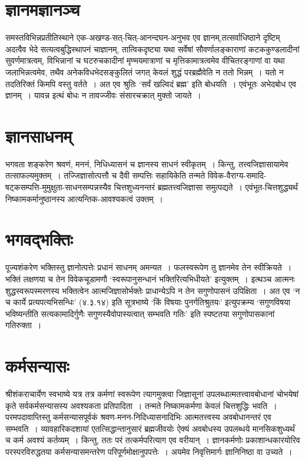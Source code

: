 {\section*{ज्ञानमज्ञानञ्च}

समस्तविभिन्नप्रतीतिस्थाने एक-अखण्ड-सत्-चित्-आनन्दघन-अनुभव एव ज्ञानम्,\break तत्सर्वाधिष्ठाने दृष्टिम् अदत्वैव भेदे सत्यत्वबुद्धिस्थापनं चाज्ञानम्, तात्विकदृष्ट्या यथा सर्वेषां सौवर्णालङ्काराणां कटककुण्डलादीनां सुवर्णमात्रत्वम्, विभिन्नानां च घटरुचकादीनां मृण्मयमात्राणां च मृत्तिकामात्रत्वमेव वीचितरङ्गाणां वा यथा जलाभिन्नत्वमेव, तथैव अनेकविध\-भेदसङ्कुलितं जगत् केवलं शुद्धं परब्रह्मैवेति न ततो भिन्नम्~। यतो न तदतिरिक्तं किमपि वस्तु वर्तते~। अत एव श्रुतिः ‘सर्वं खल्विदं ब्रह्म’ इति बोधयति~। एवंभूतः अभेदबोध एव ज्ञानम्~। यावन्न इत्थं बोधः न तावज्जीवः संसारचक्रात् मुक्तो जायते~। 

\section*{ज्ञानसाधनम्}

भगवता शङ्करेण श्रवणं, मननं, निधिध्यासनं च ज्ञानस्य साधनं स्वीकृतम्~। किन्तु, तत्त्वजिज्ञासायामेव तत्साफल्यमुक्तम्~। तज्जिज्ञासोत्पत्तौ च दैवी सम्पत्तिः सहायिकेति तन्मते विवेक-वैराग्य-समादि-षट्कसम्पत्ति-मुमुक्षुता-साधनसम्पन्नस्यैव चित्तशुध्यनन्तरं ब्रह्मतत्त्वजिज्ञासा समुत्पद्यते~। एवंभूत-चित्तशुद्ध्यर्थं निष्कामकर्मानुष्ठानस्य आत्यन्तिक-आवश्यकत्वं उक्तम्~। 

\section*{भगवद्भक्तिः}

पूज्यशंकरेण भक्तिस्तु ज्ञानोत्पत्तेः प्रधानं साधनम् अमन्यत~। फलस्वरूपेण तु ज्ञानमेव तेन स्वीक्रियते~। भक्तिं लक्षणया च तेन विवेकचूडामणौ ‘स्वरूपानुसन्धानं भक्तिरित्यभिधीयते’ इत्युक्तम्~। इत्थञ्च आत्मनः शुद्धस्वरूपस्मरणस्य भक्तित्वेन आत्मजिज्ञासोर्भक्तेः प्राधान्येऽपि न तेन सगुणोपासनं उपिक्षिता~। अत एव ‘न च कार्ये प्रत्यपत्यभिसन्धिः’ (४.३.१४) इति सूत्रभाष्ये ‘किं विषयाः पुनर्गतिश्रुतयः’ इत्युपक्रम्य ‘सगुणविषया भविष्यन्तीति सत्यकामादिर्गुणैः सगुणस्यैवोपास्यत्वात् सम्भवति गतिः’ इति स्पष्टतया सगुणोपासकानां गतिरुक्ता~। 

\section*{कर्मसन्यासः}

श्रीशंकराचार्येण स्वभाष्ये यत्र तत्र कर्मणां स्वरूपेण त्यागमुक्त्वा जिज्ञासूनां उपलब्धात्मतत्त्वावबोधानां चोभयेषां कृते सर्वकर्मसन्यासस्य अवश्यकता प्रतिपादिता~। तन्मते निष्काम\-कर्मणा केवलं चित्तशुद्धिः भवति~। परमपदावाप्तिस्तु कर्मसन्यासपूर्वकं श्रवण-मनन-निदिध्या\-सनादिभिः आत्मतत्त्वस्य अवबोधानन्तरं एव सम्भवति~। व्यावहारिकदशायां एतत्सिद्धान्तानुसारं ब्रह्मजीवयोः ऐक्यं अवबोधस्य उपलब्धये मानसिकशुध्यर्थं च कर्म अवश्यं कर्तव्यम्~। किन्तु, ततः परं तत्कर्मपरित्याग एव वरीयान्~। ज्ञानकर्मणोः प्रकाशान्धकारयोरिव परस्परविरुद्धतया कर्मसन्यासमन्तरेण परिपूर्णमोक्षानुपपत्तेः~। अयमेव निवृत्तिमार्गः ज्ञानिनिष्ठा वा उच्यते~। 

}
